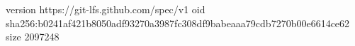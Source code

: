 version https://git-lfs.github.com/spec/v1
oid sha256:b0241af421b8050adf93270a3987fc308df9babeaaa79cdb7270b00e6614ce62
size 2097248
